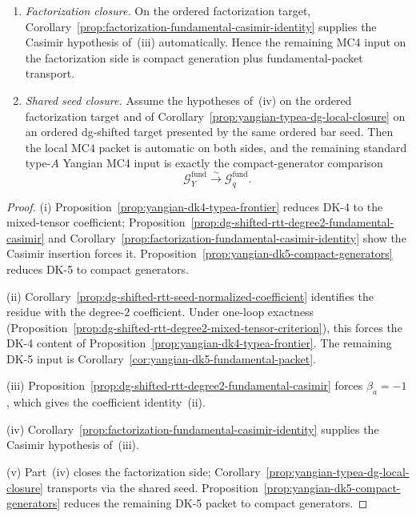 \begin{corollary}
\begin{enumerate}[label=\textup{(\roman*)}]
\item\emph{Factorization closure.}
 On the ordered factorization target,
 Corollary~\ref{prop:factorization-fundamental-casimir-identity}
 supplies the Casimir hypothesis of~\textup{(iii)} automatically.
 Hence the remaining MC4 input on the factorization side is compact
 generation plus fundamental-packet transport.

\item\emph{Shared seed closure.}
 Assume the hypotheses of~\textup{(iv)} on the ordered factorization
 target and of
 Corollary~\ref{prop:yangian-typea-dg-local-closure} on an ordered
 dg-shifted target presented by the same ordered bar seed. Then the
 local MC4 packet is automatic on both sides, and the remaining
 standard type-$A$ Yangian MC4 input is exactly the compact-generator
 comparison
 \[
 \mathcal{G}^{\mathrm{fund}}_Y
 \xrightarrow{\sim}
 \mathcal{G}^{\mathrm{fund}}_q.
 \]
\end{enumerate}
\end{corollary}

\begin{proof}
\textup{(i)}
Proposition~\ref{prop:yangian-dk4-typea-frontier} reduces DK-4 to the
mixed-tensor coefficient;
Proposition~\ref{prop:dg-shifted-rtt-degree2-fundamental-casimir}
and Corollary~\ref{prop:factorization-fundamental-casimir-identity}
show the Casimir insertion forces it.
Proposition~\ref{prop:yangian-dk5-compact-generators} reduces DK-5 to
compact generators.

\textup{(ii)}
Corollary~\ref{prop:dg-shifted-rtt-seed-normalized-coefficient}
identifies the residue with the degree-$2$ coefficient. Under
one-loop exactness
(Proposition~\ref{prop:dg-shifted-rtt-degree2-mixed-tensor-criterion}),
this forces the DK-4 content of
Proposition~\ref{prop:yangian-dk4-typea-frontier}. The remaining
DK-5 input is
Corollary~\ref{cor:yangian-dk5-fundamental-packet}.

\textup{(iii)}
Proposition~\ref{prop:dg-shifted-rtt-degree2-fundamental-casimir}
forces \(\beta_a=-1\), which gives the coefficient
identity~\textup{(ii)}.

\textup{(iv)}
Corollary~\ref{prop:factorization-fundamental-casimir-identity}
supplies the Casimir hypothesis of~\textup{(iii)}.

\textup{(v)}
Part~\textup{(iv)} closes the factorization side;
Corollary~\ref{prop:yangian-typea-dg-local-closure} transports via
the shared seed.
Proposition~\ref{prop:yangian-dk5-compact-generators} reduces the
remaining DK-5 packet to compact generators.
\end{proof}


